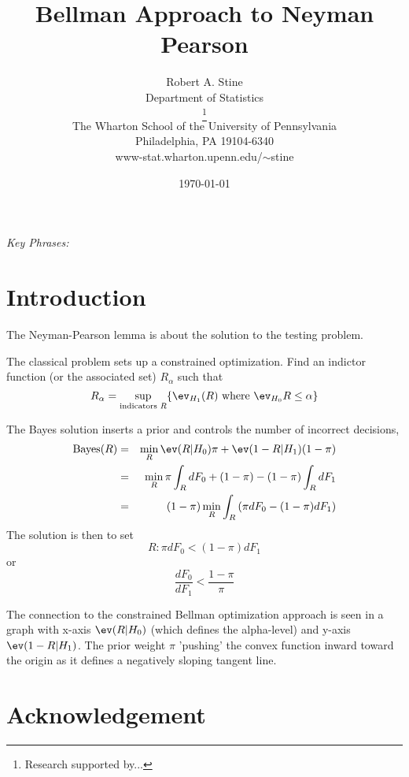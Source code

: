 \documentclass[12pt]{article}
\title{ Bellman Approach to Neyman Pearson }
\author{
        Robert A. Stine                     \\
        Department of Statistics            \\
        \thanks{Research supported by... }  \\
        The Wharton School of the University of Pennsylvania \\
        Philadelphia, PA 19104-6340                          \\
        www-stat.wharton.upenn.edu/$\sim$stine 
}
\date{\today}
\begin{document}
\maketitle 

\abstract{  
}

\vspace{0.05in}

\noindent
{\it Key Phrases: } 

\clearpage

% 

\section{Introduction}

The Neyman-Pearson lemma is about the solution to the testing problem.

The classical problem sets up a constrained optimization.  Find an
 indictor function (or the associated set) $R_\alpha$ such that
 \begin{displaymath}
  R_\alpha = \sup_{\mbox{\scriptsize indicators } R } \{ \ev_{H_1}(R) 
             \mbox{ where } \ev_{H_0} R \le \alpha \}   
 \end{displaymath}


The Bayes solution inserts a prior and controls the number of
incorrect decisions,
\begin{eqnarray*}
  \mbox{Bayes}(R) 
  &=& \min_R \ev(R|H_0) \pi + \ev(1-R|H_1) (1-\pi) \cr
  &=& \min_R \pi \int_R dF_0 + (1-\pi) - (1-\pi)\int_{R} dF_1 \cr
  &=& (1-\pi) \min_R \int_R \left( \pi dF_0 - (1-\pi) dF_1 \right)
\end{eqnarray*}
The solution is then to set
 \begin{displaymath}
     R: \pi dF_0 < (1-\pi) dF_1   
 \end{displaymath}
or 
 \begin{displaymath}
    \frac{dF_0}{dF_1} < \frac{1-\pi}{\pi}   
 \end{displaymath}


The connection to the constrained Bellman optimization approach is
 seen in a graph with x-axis $\ev(R|H_0)$ (which defines the
 alpha-level) and y-axis $\ev(1-R|H_1)$.  The prior weight $\pi$
 'pushing' the convex function inward toward the origin as it defines
 a negatively sloping tangent line.
\section*{Acknowledgement}





\end{document}
